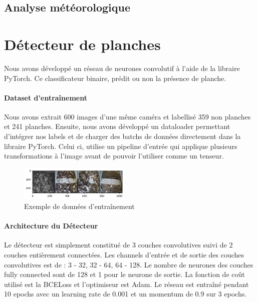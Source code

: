 
\subsection{Analyse météorologique}







\section{Détecteur de planches}

Nous avons développé un réseau de neurones convolutif à l'aide de la libraire PyTorch. Ce classificateur binaire, prédit ou non la présence de planche.

\paragraph*{Dataset d'entraînement}

Nous avons extrait 600 images d'une même caméra et labellisé 359 non planches et 241 planches. Ensuite, nous avons développé un dataloader permettant d'intégrer nos labels et de charger des batchs de données directement dans la libraire PyTorch. Celui ci, utilise un pipeline d'entrée qui applique plusieurs transformations à l'image avant de pouvoir l'utiliser comme un tenseur.

\begin{figure}[!htb]
    \centering
    \includegraphics[width=200px]{images/filtre_exemple_data}
    \caption{Exemple de données d'entraînement}
    \label{fig:Entraînement du filtre}
\end{figure}

\paragraph*{Architecture du Détecteur}

Le détecteur est simplement constitué de 3 couches convolutives suivi de 2 couches entièrement connectées. Les channels d'entrée et de sortie des couches convolutives est de : 3 - 32, 32 - 64, 64 - 128. Le nombre de neurones des couches fully connected sont de 128 et 1 pour le neurone de sortie. La fonction de coût utilisé est la BCELoss et l'optimiseur est Adam. Le réseau est entraîné pendant 10 epochs avec un learning rate de 0.001 et un momentum de 0.9 sur 3 epochs.

